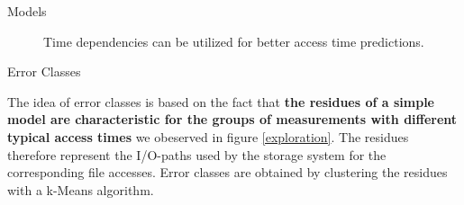 \documentclass[final]{beamer}
\newlength{\onecolwid}
\begin{document}
\begin{frame}[t]
\begin{columns}[t]
\begin{column}{\onecolwid}
\begin{block}{Models}
	\begin{figure}
		\hfill
		\caption{Time dependencies can be utilized for better access time predictions.}
		\label{time_dep}
	\end{figure} 
	
	
\end{block}

\vspace*{-2cm}
\begin{block}{Error Classes}
	
The idea of error classes is based on the fact that \textbf{the residues of a simple model are characteristic for the groups of measurements with different typical access times} we obeserved in figure \ref{exploration}. The residues therefore represent the I/O-paths used by the storage system for the corresponding file accesses. 
Error classes are obtained by clustering the residues with a k-Means algorithm.


\end{block}
\end{column}
\end{columns}
\end{frame}
\end{document}
